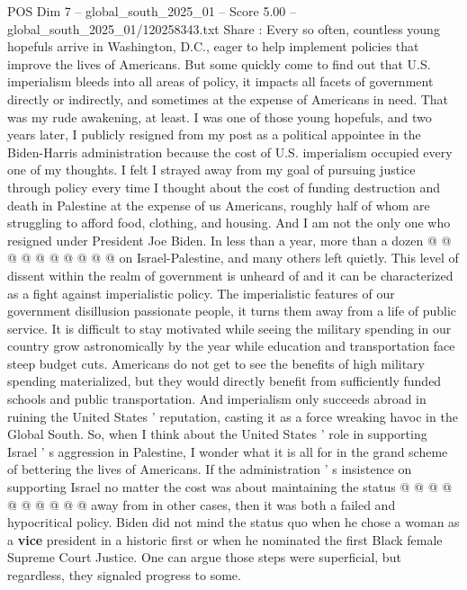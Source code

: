 \begin{textsample}{POS Dim 7 – global\_south\_2025\_01 – Score 5.00 – global\_south\_2025\_01/120258343.txt}  \label{ex:f7_pos_344}
Share : Every so often, countless young hopefuls arrive in Washington, D.C., eager to help implement policies that improve the lives of Americans.
But some quickly come to find out that U.S. imperialism bleeds into all areas of policy, it impacts all facets of government directly or indirectly, and sometimes at the expense of Americans in need.
That was my rude awakening, at least.
I was one of those young hopefuls, and two years later, I publicly resigned from my post as a political appointee in the Biden-Harris administration because the cost of U.S. imperialism occupied every one of my thoughts.
I felt I strayed away from my goal of pursuing justice through policy every time I thought about the cost of funding destruction and death in Palestine at the expense of us Americans, roughly half of whom are struggling to afford food, clothing, and housing.
And I am not the only one who resigned under President Joe Biden.
In less than a year, more than a dozen @ @ @ @ @ @ @ @ @ @ on Israel-Palestine, and many others left quietly.
This level of dissent within the realm of government is unheard of and it can be characterized as a fight against imperialistic policy.
The imperialistic features of our government disillusion passionate people, it turns them away from a life of public service.
It is difficult to stay motivated while seeing the military spending in our country grow astronomically by the year while education and transportation face steep budget cuts.
Americans do not get to see the benefits of high military spending materialized, but they would directly benefit from sufficiently funded schools and public transportation.
And imperialism only succeeds abroad in ruining the United States ' reputation, casting it as a force wreaking havoc in the Global South.
So, when I think about the United States ' role in supporting Israel ' s aggression in Palestine, I wonder what it is all for in the grand scheme of bettering the lives of Americans.
If the administration ' s insistence on supporting Israel no matter the cost was about maintaining the status @ @ @ @ @ @ @ @ @ @ away from in other cases, then it was both a failed and hypocritical policy.
Biden did not mind the status quo when he chose a woman as a \textbf{vice} president in a historic first or when he nominated the first Black female Supreme Court Justice.
One can argue those steps were superficial, but regardless, they signaled progress to some.

\end{textsample}
